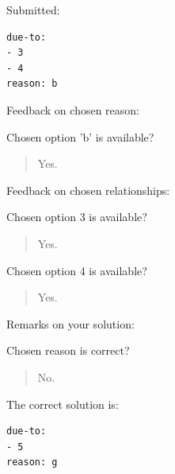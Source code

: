 Submitted:


\begin{verbatim}
due-to:
- 3
- 4
reason: b
\end{verbatim}


Feedback on chosen reason:

Chosen option 'b' is available?\begin{quote}Yes.\end{quote}Feedback on chosen relationships:

Chosen option 3 is available?\begin{quote}Yes.\end{quote}Chosen option 4 is available?\begin{quote}Yes.\end{quote}Remarks on your solution:

Chosen reason is correct?\begin{quote}No.\end{quote}The correct solution is:
\begin{verbatim}
due-to:
- 5
reason: g

\end{verbatim}


